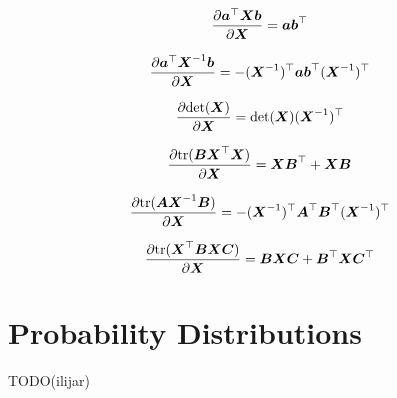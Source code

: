 \documentclass{article}
\begin{document}
\begin{align}
  \frac{\partial \vec a\T \mat X \vec b}{\partial \mat X}
    = \vec a \vec b\T
\end{align}

\begin{align}
  \frac{\partial \vec a\T \mat X\inv \vec b}{\partial \mat X}
    = - (\mat X\inv)\T \vec a \vec b\T (\mat X\inv)\T
\end{align}

\begin{align}
  \frac{\partial \determ{\mat X}}{\partial \mat X}
    = \determ{\mat X} (\mat X\inv)\T
\end{align}

\begin{align}
  \frac{\partial \tr{\mat B \mat X\T \mat X}}{\partial \mat X}
    = \mat X \mat B\T + \mat X \mat B
\end{align}

\begin{align}
  \frac{\partial \tr{\mat A \mat X\inv \mat B}}{\partial \mat X}
    = -(\mat X\inv)\T \mat A\T \mat B\T (\mat X\inv)\T
\end{align}

\begin{align}
  \frac{\partial \tr{\mat X\T \mat B \mat X \mat C}}{\partial \mat X}
    = \mat B \mat X \mat C + \mat B\T \mat X \mat C\T
\end{align}

\newpage
\section{Probability Distributions}
TODO(ilijar)
\end{document}
